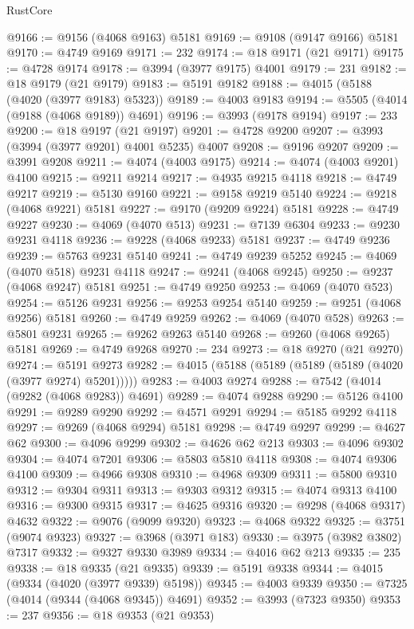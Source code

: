 \begin{lexlean}{RustCore}
\begin{coremodule}
@9166 := @9156 (@4068 @9163) @5181
@9169 := @9108 (@9147 @9166) @5181
@9170 := @4749 @9169
@9171 := 232
@9174 := @18 @9171 (@21 @9171)
@9175 := @4728 @9174
@9178 := @3994 (@3977 @9175) @4001
@9179 := 231
@9182 := @18 @9179 (@21 @9179)
@9183 := @5191 @9182
@9188 := @4015 (@5188 (@4020 (@3977 @9183) @5323))
@9189 := @4003 @9183
@9194 := @5505 (@4014 (@9188 (@4068 @9189)) @4691)
@9196 := @3993 (@9178 @9194)
@9197 := 233
@9200 := @18 @9197 (@21 @9197)
@9201 := @4728 @9200
@9207 := @3993 (@3994 (@3977 @9201) @4001 @5235) @4007
@9208 := @9196 @9207
@9209 := @3991 @9208
@9211 := @4074 (@4003 @9175)
@9214 := @4074 (@4003 @9201) @4100
@9215 := @9211 @9214
@9217 := @4935 @9215 @4118
@9218 := @4749 @9217
@9219 := @5130 @9160
@9221 := @9158 @9219 @5140
@9224 := @9218 (@4068 @9221) @5181
@9227 := @9170 (@9209 @9224) @5181
@9228 := @4749 @9227
@9230 := @4069 (@4070 @513)
@9231 := @7139 @6304
@9233 := @9230 @9231 @4118
@9236 := @9228 (@4068 @9233) @5181
@9237 := @4749 @9236
@9239 := @5763 @9231 @5140
@9241 := @4749 @9239 @5252
@9245 := @4069 (@4070 @518) @9231 @4118
@9247 := @9241 (@4068 @9245)
@9250 := @9237 (@4068 @9247) @5181
@9251 := @4749 @9250
@9253 := @4069 (@4070 @523)
@9254 := @5126 @9231
@9256 := @9253 @9254 @5140
@9259 := @9251 (@4068 @9256) @5181
@9260 := @4749 @9259
@9262 := @4069 (@4070 @528)
@9263 := @5801 @9231
@9265 := @9262 @9263 @5140
@9268 := @9260 (@4068 @9265) @5181
@9269 := @4749 @9268
@9270 := 234
@9273 := @18 @9270 (@21 @9270)
@9274 := @5191 @9273
@9282 := @4015 (@5188 (@5189 (@5189 (@5189 (@4020 (@3977 @9274) @5201)))))
@9283 := @4003 @9274
@9288 := @7542 (@4014 (@9282 (@4068 @9283)) @4691)
@9289 := @4074 @9288
@9290 := @5126 @4100
@9291 := @9289 @9290
@9292 := @4571 @9291
@9294 := @5185 @9292 @4118
@9297 := @9269 (@4068 @9294) @5181
@9298 := @4749 @9297
@9299 := @4627 @62
@9300 := @4096 @9299
@9302 := @4626 @62 @213
@9303 := @4096 @9302
@9304 := @4074 @7201
@9306 := @5803 @5810 @4118
@9308 := @4074 @9306 @4100
@9309 := @4966 @9308
@9310 := @4968 @9309
@9311 := @5800 @9310
@9312 := @9304 @9311
@9313 := @9303 @9312
@9315 := @4074 @9313 @4100
@9316 := @9300 @9315
@9317 := @4625 @9316
@9320 := @9298 (@4068 @9317) @4632
@9322 := @9076 (@9099 @9320)
@9323 := @4068 @9322
@9325 := @3751 (@9074 @9323)
@9327 := @3968 (@3971 @183)
@9330 := @3975 (@3982 @3802) @7317
@9332 := @9327 @9330 @3989
@9334 := @4016 @62 @213
@9335 := 235
@9338 := @18 @9335 (@21 @9335)
@9339 := @5191 @9338
@9344 := @4015 (@9334 (@4020 (@3977 @9339) @5198))
@9345 := @4003 @9339
@9350 := @7325 (@4014 (@9344 (@4068 @9345)) @4691)
@9352 := @3993 (@7323 @9350)
@9353 := 237
@9356 := @18 @9353 (@21 @9353)

\end{coremodule}
\end{lexlean}
